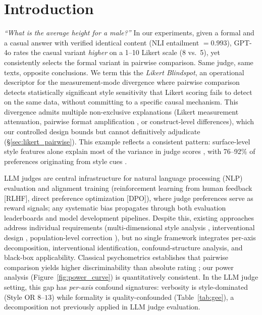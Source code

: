 \section{Introduction}

\emph{``What is the average height for a male?''} In our experiments, given a formal and a casual answer with verified identical content (NLI entailment $= 0.993$), GPT-4o rates the casual variant \emph{higher} on a 1--10 Likert scale (8 vs.\ 5), yet consistently selects the formal variant in pairwise comparison.
Same judge, same texts, opposite conclusions.
We term this the \emph{Likert Blindspot}, an operational descriptor for the measurement-mode divergence where pairwise comparison detects statistically significant style sensitivity that Likert scoring fails to detect on the same data, without committing to a specific causal mechanism.
This divergence admits multiple non-exclusive explanations (Likert measurement attenuation, pairwise format amplification \citep{jeong2025comparative}, or construct-level differences), which our controlled design bounds but cannot definitively adjudicate (\S\ref{sec:likert_pairwise}).
This example reflects a consistent pattern: surface-level style features alone explain most of the variance in judge scores \citep{murugadoss2025sos}, with 76--92\% of preferences originating from style cues \citep{li2026preference,soumik2026judging}.

LLM judges are central infrastructure for natural language processing (NLP) evaluation and alignment training (reinforcement learning from human feedback [RLHF], direct preference optimization [DPO]), where judge preferences serve as reward signals; any systematic bias propagates through both evaluation leaderboards and model development pipelines.
Despite this, existing approaches address individual requirements (multi-dimensional style analysis \citep{casse2026concise,wang2026fairjudge}, interventional design \citep{reber2025rate}, population-level correction \citep{dubois2025lc}), but no single framework integrates per-axis decomposition, interventional identification, confound-structure analysis, and black-box applicability.
Classical psychometrics establishes that pairwise comparison yields higher discriminability than absolute rating \citep{thurstone1927law,david1988method}; our power analysis (Figure~\ref{fig:power_curve}) is quantitatively consistent.
In the LLM judge setting, this gap has \emph{per-axis} confound signatures: verbosity is style-dominated (Style OR $8$--$13$) while formality is quality-confounded (Table~\ref{tab:gee}), a decomposition not previously applied in LLM judge evaluation.

